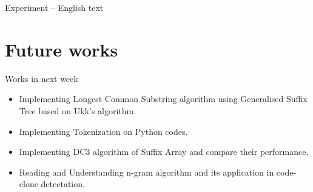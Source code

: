 \begin{frame}[shrink=15]{Experiment -- English text}


\end{frame}
\section{Future works}
\begin{frame}{Works in next week}
\transwipe[direction=270]
\begin{itemize}[<+->]
\item Implementing \alert{Longest Common Substring} algorithm using
\alert{Generalised Suffix Tree} based on Ukk's algorithm.
\item Implementing \alert{Tokenization} on Python codes.
\item Implementing \alert{DC3} algorithm of \alert{Suffix Array} and compare
their performance.
\item Reading and Understanding \alert{n-gram} algorithm and its
application in code-clone detectation.
\end{itemize}
\end{frame}

